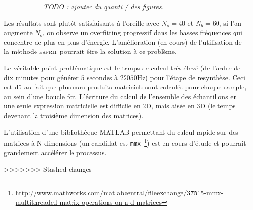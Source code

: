% 
=======
  \emph{TODO : ajouter du quanti / des figures.}
  
  Les résultats sont plutôt satisfaisants à l'oreille avec \( N_s = 40 \) et
\( N_b = 60 \), si l'on augmente \( N_b \), on observe un overfitting
progressif dans les basses fréquences qui concentre de plus en plus d'énergie.
L'amélioration (en cours) de l'utilisation de la méthode \textsc{esprit}
pourrait être la solution à ce problème.

Le véritable point problématique est le temps de calcul très élevé (de l'ordre
de dix minutes pour générer \( 5 \) secondes à \( \si{22050\hertz{}} \))
pour l'étape de resynthèse. Ceci est dû au fait que plusieurs produits
matriciels sont calculés pour chaque sample, au sein d'une boucle for.
L'écriture du calcul de l'ensemble des échantillons en une seule expression
matricielle est difficile en 2D, mais aisée en 3D (le temps devenant la
troisième dimension des matrices).

  L'utilisation d'une bibliothèque MATLAB permettant du calcul rapide sur
des matrices à N-dimensions (un candidat est
\texttt{mmx}~\footnote{%
\url{http://www.mathworks.com/matlabcentral/fileexchange/37515-mmx-multithreaded-matrix-operations-on-n-d-matrices}})
est en cours d'étude et pourrait grandement accélérer le processus.

>>>>>>> Stashed changes

